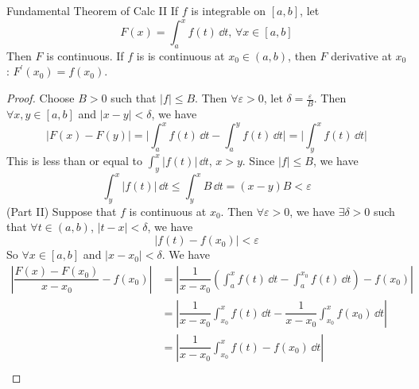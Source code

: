 \documentclass{report}
\begin{document}
\begin{theorem}{Fundamental Theorem of Calc II}
    If $f$ is integrable on $[a, b]$, let 
        \begin{equation*}
            F(x) = \int_{a}^{x} f(t) \, \dd{t} , \, \forall x \in  [ a, b]
        \end{equation*}
    Then $F$ is continuous. If $f$ is is continuous at $x_{0} \in ( a, b)$, then $F$ derivative at $x_{0}$: $F^{\prime}(x_{0}) = f(x_{0})$. 
\end{theorem}
    \begin{proof}
        Choose $B > 0$ such that $\lvert f \rvert \leq  B$. Then $\forall \varepsilon>  0$, let $\delta = \frac{ \varepsilon}{ B}$. Then $\forall x, y \in  [ a, b]$ and $\lvert x - y \rvert <  \delta$, we have 
            \begin{equation*}
                \lvert F(x) - F(y) \rvert = \lvert  \int_{a}^{x} f(t) \, \dd{t}  - \int_{a}^{y} f(t) \, \dd{t}  \rvert = \lvert  \int_{y}^{x} f(t) \, \dd{t}  \rvert
            \end{equation*}
        This is less than or equal to $\int_{y}^{x} \lvert f(t) \rvert \, \dd{ t}$, $x > y$. Since $\lvert f \rvert \leq  B$, we have 
            \begin{equation*}
                \int_{y}^{x} \lvert f(t) \rvert \, \dd{ t}  \leq \int_{ y}^{x} B \, \dd{t} =  ( x - y)B < \varepsilon
            \end{equation*}
        (Part II) Suppose that $f$ is continuous at $x_{0}$. Then $\forall \varepsilon>  0$, we have $\exists \delta > 0$ such that $\forall t\in  ( a, b)$, $\lvert t - x \rvert <   \delta$, we have
            \begin{equation*}
                \lvert f(t) - f(x_{0}) \rvert <  \varepsilon
            \end{equation*}
        So $\forall x \in  [ a, b]$ and $  \lvert x - x_{0} \rvert < \delta$. We have 
            \begin{align*}
                \left\lvert \dfrac{F(x) - F(x_{0})}{x - x_{0}} - f( x_{0}) \right\rvert &= \left\lvert \dfrac{1}{x - x_{0}}(\int_{a}^{x} f(t) \, \dd{t}  - \int_{a}^{x_{0}} f(t) \, \dd{t} ) - f(x_{0}) \right\rvert \\
                                                                                        &= \left\lvert \dfrac{1}{x - x_{0}}\int_{x_{0}}^{x} f(t) \, \dd{t} - \dfrac{1}{x - x_{0}}\int_{x_{0}}^{x} f(x_{0}) \, \dd{t}  \right\rvert \\
                                                                                        &= \left\lvert \dfrac{1}{x - x_{0}} \int_{x_{0}}^{x} f(t) - f(x_{0}) \, \dd{t}  \right\rvert \\

\end{align*}
\end{proof}
\end{document}
